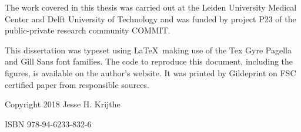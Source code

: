 \vspace*{6.5cm}

\noindent
The work covered in this thesis was carried out at the Leiden University Medical Center and Delft University of Technology and was funded by project P23 of the public-private research community COMMIT.
\vspace*{1cm}

\noindent 
This dissertation was typeset using \LaTeX \, making use of the Tex Gyre Pagella and Gill Sans font families. The code to reproduce this document, including the figures, is available on the author's website. It was printed by Gildeprint on FSC certified paper from responsible sources.
\vspace*{1cm}



\noindent
Copyright \textcopyright{} 2018 Jesse H. Krijthe

\noindent
ISBN 978-94-6233-832-6
